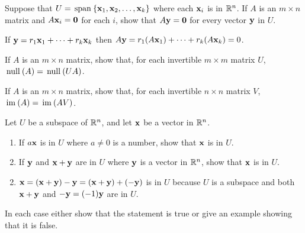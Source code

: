 \begin{multicols}{2}
\begin{ex}
Suppose that $U = \thinspace\operatorname{span\medspace}\{\textbf{x}_{1}, \textbf{x}_{2}, \dots, \textbf{x}_{k}\}$ where each $\textbf{x}_{i}$ is in $\mathbb{R} ^n$. If $A$ is an $m \times n$ matrix and $A\textbf{x}_{i} = \textbf{0}$ for each $i$, show that $A\textbf{y} = \textbf{0}$ for every vector $\textbf{y}$ in $U$.

\begin{sol}
If $\textbf{y} = r_{1}\textbf{x}_{1} + \dots + r_{k}\textbf{x}_{k}$ then $A\textbf{y} = r_{1}(A\textbf{x}_{1}) + \dots + r_{k}(A\textbf{x}_{k}) = 0$.
\end{sol}
\end{ex}

\begin{ex}
If $A$ is an $m \times n$ matrix, show that, for each invertible $m \times m$ matrix $U$, $\thinspace\operatorname{null\medspace}(A) = \thinspace\operatorname{null\medspace}(UA)$.
\end{ex}

\begin{ex}
If $A$ is an $m \times n$ matrix, show that, for each invertible $n \times n$ matrix $V$, $\thinspace\operatorname{im\medspace}(A) = \thinspace\operatorname{im\medspace}(AV)$.
\end{ex}

\begin{ex}
Let $U$ be a subspace of $\mathbb{R}^n$, and let $\textbf{x}$ be a vector in $\mathbb{R}^n$.

\begin{enumerate}[label={\alph*.}]
\item If $a\textbf{x}$ is in $U$ where $a \neq 0$ is a number, show that $\textbf{x}$ is in $U$.

\item If $\textbf{y}$ and $\textbf{x} + \textbf{y}$ are in $U$ where $\textbf{y}$ is a vector in $\mathbb{R}^n$, show that $\textbf{x}$ is in $U$.

\end{enumerate}
\begin{sol}
\begin{enumerate}[label={\alph*.}]
\setcounter{enumi}{1}
\item  $\textbf{x} = (\textbf{x} + \textbf{y}) - \textbf{y} = (\textbf{x} + \textbf{y}) + (-\textbf{y})$ is in $U$ because $U$ is a subspace and both $\textbf{x} + \textbf{y}$ and $-\textbf{y} = (-1)\textbf{y}$ are in $U$.

\end{enumerate}
\end{sol}
\end{ex}

\begin{ex}
In each case either show that the statement is true or give an example showing that it is false.


\end{ex}
\end{multicols}
